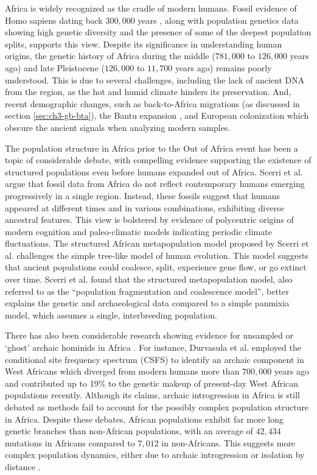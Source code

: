 Africa is widely recognized as the cradle of modern humans. 
%
Fossil evidence of Homo sapiens dating back $300{,}000$ years \cite{day1969early,hublin2017new}, along with population genetics data showing high genetic diversity and the presence of some of the deepest population splits, supports this view.
%
Despite its significance in understanding human origins, the genetic history of Africa during the middle ($781{,}000$ to $126{,}000$ years ago) and late Pleistocene ($126{,}000$ to $11{,}700$ years ago) remains poorly understood. 
%
This is due to several challenges, including the lack of ancient DNA from the region, as the hot and humid climate hinders its preservation. And, recent demographic changes, such as back-to-Africa migrations (as discussed in section \ref{sec:ch3-gb-bta}), the Bantu expansion \cite{tishkoff2009genetic}, and European colonization which obscure the ancient signals when analyzing modern samples.

The population structure in Africa prior to the Out of Africa event has been a topic of considerable debate, with compelling evidence supporting the existence of structured populations even before humans expanded out of Africa.
%
Scerri et al. \cite{scerri2019beyond} argue that fossil data from Africa do not reflect contemporary humans emerging progressively in a single region. Instead, these fossils suggest that humans appeared at different times and in various combinations, exhibiting diverse ancestral features. This view is bolstered by evidence of polycentric origins of modern cognition and paleo-climatic models indicating periodic climate fluctuations.
%
The structured African metapopulation model proposed by Scerri et al. challenges the simple tree-like model of human evolution. This model suggests that ancient populations could coalesce, split, experience gene flow, or go extinct over time. Scerri et al. found that the structured metapopulation model, also referred to as the ``population fragmentation and coalescence model'', better explains the genetic and archaeological data compared to a simple panmixia model, which assumes a single, interbreeding population.

There has also been considerable research showing evidence for unsampled or `ghost' archaic hominids in Africa \cite{ragsdale2019models,hammer2011genetic,lorente2019whole,durvasula2020recovering}. For instance, Durvasula et al. employed the conditional site frequency spectrum (CSFS) to identify an archaic component in West Africans which diverged from modern humans more than $700{,}000$ years ago and contributed up to 19\% to the genetic makeup of present-day West African populations recently. Although its claims, archaic introgression in Africa is still debated as methods fail to account for the possibly complex population structure in Africa.
%
Despite these debates, African populations exhibit far more long genetic branches than non-African populations, with an average of $42{,}434$ mutations in Africans compared to $7{,}012$ in non-Africans. This suggests more complex population dynamics, either due to archaic introgression or isolation by distance \cite{speidel2019method}.

